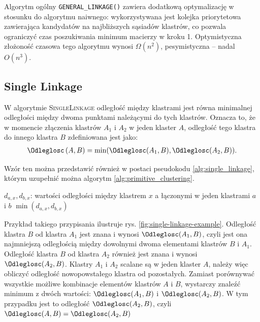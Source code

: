 \documentclass[a4paper,twoside,12pt]{book}
\newcommand{\procedura}[1]{\textsc{#1}}
\newcommand{\SingleLinkage}{\procedura{Si\-ng\-le\-Lin\-ka\-ge}}
\begin{document}
Algorytm ogólny \texttt{GENERAL\_LINKAGE()} zawiera dodatkową optymalizację w stosunku do algorytmu naiwnego: wykorzystywana jest kolejka priorytetowa zawierająca kandydatów na najbliższych sąsiadów klastrów, co pozwala ograniczyć czas poszukiwania minimum macierzy w kroku 1. Optymistyczna złożoność czasowa tego algorytmu wynosi $\Omega(n^{2})$, pesymistyczna -- nadal $O(n^{3})$.

\subsection{Single Linkage}

W algorytmie \SingleLinkage{} \cite{bib:hierarchical-clustering} odległość między klastrami jest równa minimalnej odległości między dwoma punktami należącymi do tych klastrów.
Oznacza to, że w momencie złączenia klastrów $A_{1}$ i $A_{2}$ w jeden klaster $A$, odległość tego klastra do innego klastra $B$ zdefiniowana jest jako:
\begin{align}
\Odleglosc \left(A, B\right) = \min(\Odleglosc(A_{1}, B), \Odleglosc(A_{2}, B)).
\end{align}

Wzór ten można przedstawić również w postaci pseudokodu \ref{alg:single_linkage}, którym uzupełnić można algorytm \ref{alg:primitive_clustering}.

\begin{algorithm}[t]
	\caption{Funkcja aktualizacji odległości między klastrami dla łączności \SingleLinkage{}}
	\label{alg:single_linkage}
	\begin{algorithmic}[1]
		\Require $d_{a, x}, d_{b, x}$: wartości odległości między klastrem $x$ a łączonymi w jeden klastrami $a$ i $b$
		\State \Return $\min(d_{a, x}, d_{b, x})$
		\EndProcedure
	\end{algorithmic}
\end{algorithm}

%
Przykład takiego przypisania ilustruje rys. \ref{fig:single-linkage-example}. Odległość klastra $B$ od klastra $A_{1}$ jest znana i wynosi $\Odleglosc(A_{1}, B)$, czyli jest ona najmniejszą odległością między dowolnymi dwoma elementami klastrów $B$ i $A_{1}$. Odległość klastra $B$ od klastra $A_{2}$ również jest znana i wynosi $\Odleglosc(A_{2}, B)$. Klastry $A_{1}$ i $A_{2}$ scalane są w jeden klaster $A$, należy więc obliczyć odległość nowopowstałego klastra od pozostałych. Zamiast porównywać wszystkie możliwe kombinacje elementów klastrów $A$ i $B$, wystarczy znaleźć minimum z dwóch wartości: $\Odleglosc(A_{1}, B)$ i $\Odleglosc(A_{2}, B)$. W tym przypadku jest to odległość $\Odleglosc(A_{2}, B)$, czyli $\Odleglosc(A, B) = \Odleglosc(A_{2}, B)$
\end{document}
